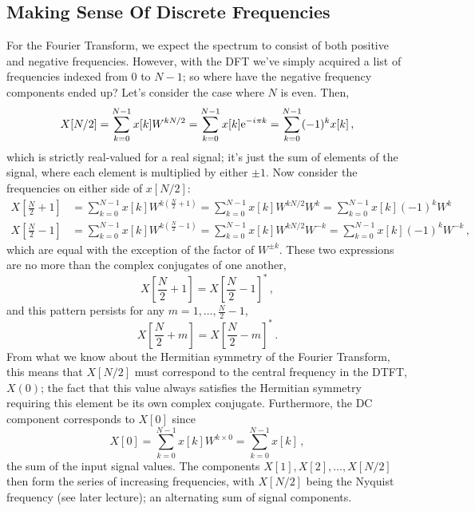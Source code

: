 \subsection{Making Sense Of Discrete Frequencies}
%
For the Fourier Transform, we expect the spectrum to consist of both positive
and negative frequencies. However, with the DFT we've simply acquired a list
of frequencies indexed from $0$ to $N-1$; so where have the negative
frequency components ended up? Let's consider the case where $N$ is even. Then,
%
\begin{displaymath}
  X[N/2] = \sum_{k=0}^{N-1}x[k]W^{kN/2} = \sum_{k=0}^{N-1}x[k]\mathrm{e}^{-{i\mkern1mu}\pi k}
  = \sum_{k=0}^{N-1}(-1)^k x[k] \,,
\end{displaymath}
%
which is strictly real-valued for a real signal; it's just the sum of elements of
the signal, where each element is multiplied by either $\pm 1$. Now consider the
frequencies on either side of $x[N/2]$:
%
\begin{align*}
  X\left[\frac{N}{2}+1\right] &= \sum_{k=0}^{N-1}x[k]W^{k\left(\frac{N}{2}+1\right)}
  = \sum_{k=0}^{N-1}x[k]W^{kN/2}W^{k} = \sum_{k=0}^{N-1}x[k](-1)^{k}W^{k} \\
  X\left[\frac{N}{2}-1\right] &= \sum_{k=0}^{N-1}x[k]W^{k\left(\frac{N}{2}-1\right)}
  = \sum_{k=0}^{N-1}x[k]W^{kN/2}W^{-k} = \sum_{k=0}^{N-1}x[k](-1)^{k} W^{-k} \,,
\end{align*}
%
which are equal with the exception of the factor of $W^{\pm k}$. These two expressions
are no more than the complex conjugates of one another,
%
\begin{displaymath}
  X\left[\frac{N}{2}+1\right] = X\left[\frac{N}{2}-1\right]^* \,,
\end{displaymath}
%
and this pattern persists for any $m = 1,\hdots,\frac{N}{2}-1$,
%
\begin{displaymath}
  X\left[\frac{N}{2}+m\right] = X\left[\frac{N}{2}-m\right]^* \,.
\end{displaymath}
%
From what we know about the Hermitian symmetry of the Fourier Transform, this
means that $X[N/2]$ must correspond to the central frequency in the DTFT,
$X(0)$; the fact that this value always satisfies the Hermitian symmetry
requiring this element be its own complex conjugate. Furthermore, the DC
component corresponds to $X[0]$ since
%
\begin{displaymath}
  X[0] = \sum_{k=0}^{N-1}x[k] W^{k\times 0} = \sum_{k=0}^{N-1}x[k] \,,
\end{displaymath}
%
the sum of the input signal values. The components $X[1], X[2], \hdots, X[N/2]$
then form the series of increasing frequencies, with $X[N/2]$ being the
Nyquist frequency (see later lecture); an alternating sum of signal components.\\

